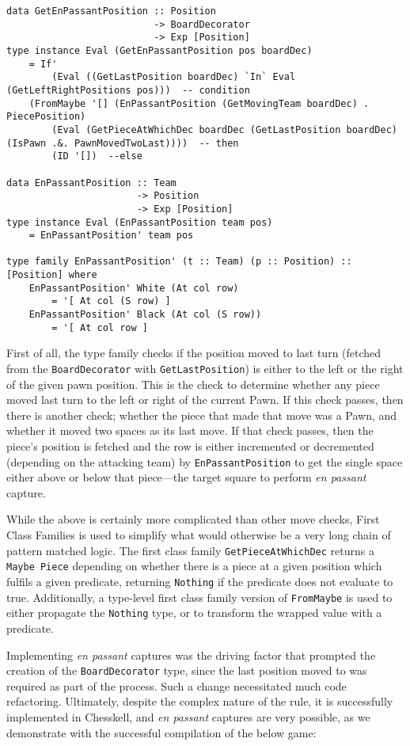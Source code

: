 \documentclass[12pt, a4paper, bibliography=totocnumbered]{scrreprt}
\newcommand{\inline}[1]{\lstinline[basicstyle=\ttfamily\footnotesize]{#1}}
\begin{document}
\begin{lstlisting}
data GetEnPassantPosition :: Position
                          -> BoardDecorator
                          -> Exp [Position]
type instance Eval (GetEnPassantPosition pos boardDec)
    = If'
        (Eval ((GetLastPosition boardDec) `In` Eval (GetLeftRightPositions pos)))  -- condition
    (FromMaybe '[] (EnPassantPosition (GetMovingTeam boardDec) . PiecePosition)
        (Eval (GetPieceAtWhichDec boardDec (GetLastPosition boardDec) (IsPawn .&. PawnMovedTwoLast))))  -- then
        (ID '[])  --else

data EnPassantPosition :: Team
                       -> Position
                       -> Exp [Position]
type instance Eval (EnPassantPosition team pos)
    = EnPassantPosition' team pos

type family EnPassantPosition' (t :: Team) (p :: Position) :: [Position] where
    EnPassantPosition' White (At col row)
        = '[ At col (S row) ]
    EnPassantPosition' Black (At col (S row))
        = '[ At col row ]
\end{lstlisting}

First of all, the type family checks if the position moved to last turn (fetched from the \inline{BoardDecorator} with \inline{GetLastPosition}) is either to the left or the right of the given pawn position. This is the check to determine whether any piece moved last turn to the left or right of the current Pawn. If this check passes, then there is another check; whether the piece that made that move was a Pawn, and whether it moved two spaces as its last move. If that check passes, then the piece's position is fetched and the row is either incremented or decremented (depending on the attacking team) by \inline{EnPassantPosition} to get the single space either above or below that piece---the target square to perform \emph{en passant} capture.

While the above is certainly more complicated than other move checks, First Class Families is used to simplify what would otherwise be a very long chain of pattern matched logic. The first class family \inline{GetPieceAtWhichDec} returns a \inline{Maybe Piece} depending on whether there is a piece at a given position which fulfils a given predicate, returning \inline{Nothing} if the predicate does not evaluate to true. Additionally, a type-level first class family version of \inline{FromMaybe} is used to either propagate the \inline{Nothing} type, or to transform the wrapped value with a predicate.

Implementing \emph{en passant} captures was the driving factor that prompted the creation of the \inline{BoardDecorator} type, since the last position moved to was required as part of the process. Such a change necessitated much code refactoring. Ultimately, despite the complex nature of the rule, it is successfully implemented in Chesskell, and \emph{en passant} captures are very possible, as we demonstrate with the successful compilation of the below game:
\end{document}
